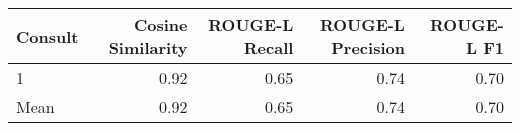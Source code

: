 \begin{tabular}{lrrrr}
\toprule
Consult & Cosine Similarity & ROUGE-L Recall & ROUGE-L Precision & ROUGE-L F1 \\
\midrule
1 & 0.92 & 0.65 & 0.74 & 0.70 \\
Mean & 0.92 & 0.65 & 0.74 & 0.70 \\
\bottomrule
\end{tabular}
